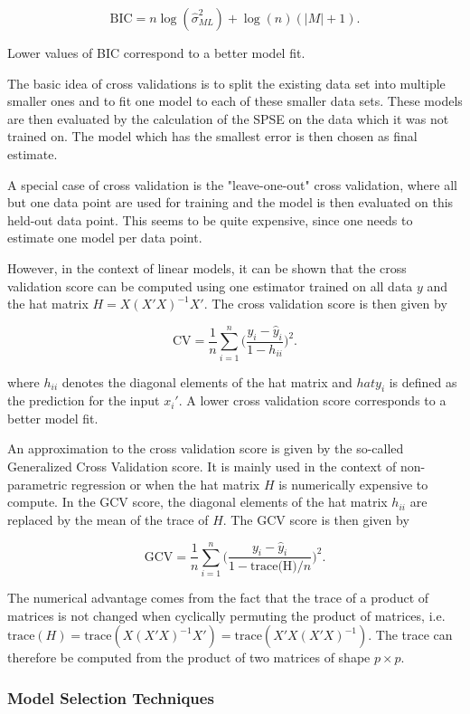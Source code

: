 $$\text{BIC} = n\log(\hat \sigma_{ML}^2) + \log(n)(\vert M\vert + 1).$$

Lower values of BIC correspond to a better model fit.


The basic idea of cross validations is to split the existing data set into multiple smaller ones and to fit one model to each of these smaller data sets. These models are then evaluated by the calculation of the SPSE on the data which it was not trained on. The model which has the smallest error is then chosen as final estimate. 

A special case of cross validation is the "leave-one-out" cross validation, where all but one data point are used for training and the model is then evaluated on this held-out data point. This seems to be quite expensive, since one needs to estimate one model per data point. 

However, in the context of linear models, it can be shown that the cross validation score can be computed using one estimator trained on all data $y$ and the hat matrix $H = X(X'X)^{-1}X'$. The cross validation score is then given by

$$\text{CV} = \frac{1}{n} \sum_{i=1}^n\big( \frac{y_i - \hat y_i}{1 - h_{ii}}\big)^2.$$

where $h_{ii}$ denotes the diagonal elements of the hat matrix and $hat y_i$ is defined as the prediction for the input $x_i'$. A lower cross validation score corresponds to a better model fit. \cite{golub1979}

An approximation to the cross validation score is given by the so-called Generalized Cross Validation score. It is mainly used in the context of non-parametric regression or when the hat matrix $H$ is numerically expensive to compute. In the GCV score, the diagonal elements of the hat matrix $h_{ii}$ are replaced by the mean of the trace of $H$. The GCV score is then given by

$$\text{GCV} = \frac{1}{n}\sum_{i=1}^n \Big( \frac{y_i - \hat y_i}{1 - \text{trace(H)}/n}\Big)^2.$$

The numerical advantage comes from the fact that the trace of a product of matrices is not changed when cyclically permuting the product of matrices, i.e. $\text{trace}(H) = \text{trace}(X(X'X)^{-1}X') = \text{trace}(X'X(X'X)^{-1})$. The trace can therefore be computed from the product of two matrices of shape $p\times p$. \cite{fahrmeir2013regression}

\subsubsection{Model Selection Techniques}

